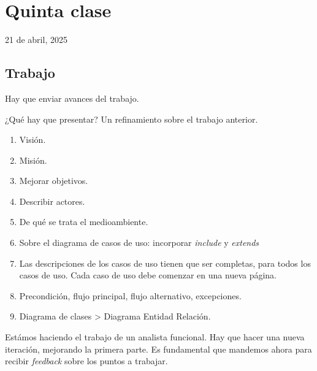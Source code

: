 \section{Quinta clase}

21 de abril, 2025

\subsection{Trabajo}

Hay que enviar avances del trabajo.

¿Qué hay que presentar?
Un refinamiento sobre el trabajo anterior.

\begin{enumerate}
    \item Visión.
    \item Misión.
    \item Mejorar objetivos.
    \item Describir actores.
    \item De qué se trata el medioambiente.
    \item Sobre el diagrama de casos de uso: incorporar \textit{include} y \textit{extends}
    \item Las descripciones de los casos de uso tienen que ser completas, para todos los casos de uso. Cada caso de uso debe comenzar en una nueva página.
    \item Precondición, flujo principal, flujo alternativo, excepciones.
    \item Diagrama de clases > Diagrama Entidad Relación.
\end{enumerate}

Estámos haciendo el trabajo de un analista funcional.
Hay que hacer una nueva iteración, mejorando la primera parte.
Es fundamental que mandemos ahora para recibir \textit{feedback} sobre los puntos a trabajar.

